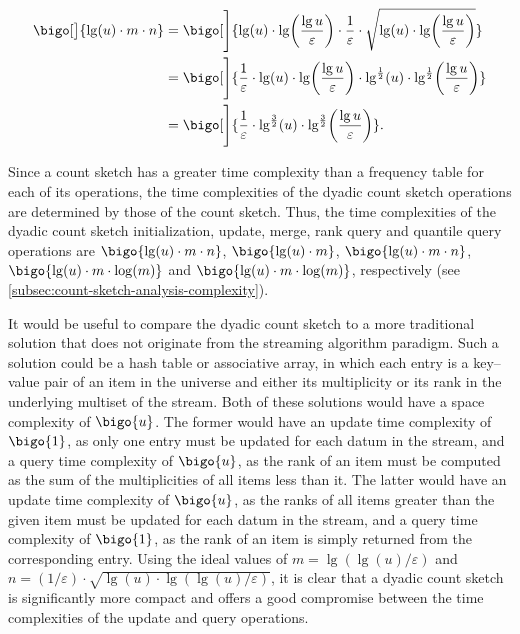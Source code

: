 \begin{equation}
  \label{eq:dyadic-count-sketch-analysis-complexity-space}
  \begin{split}
    \bigo[\big]{\lg (u) \cdot m \cdot n} &= \bigo[\Bigg]{\lg (u) \cdot \lg \biggl( \frac{\lg u}{\varepsilon} \biggr) \cdot \frac{1}{\varepsilon} \cdot \sqrt{\lg (u) \cdot \lg \biggl( \frac{\lg u}{\varepsilon} \biggr)}} \\
    &= \bigo[\Bigg]{\frac{1}{\varepsilon} \cdot \lg (u) \cdot \lg \biggl( \frac{\lg u}{\varepsilon} \biggr) \cdot \lg^{\frac{1}{2}} (u) \cdot \lg^{\frac{1}{2}} \biggl( \frac{\lg u}{\varepsilon} \biggr)} \\
    &= \bigo[\Bigg]{\frac{1}{\varepsilon} \cdot \lg^{\frac{3}{2}} (u) \cdot \lg^{\frac{3}{2}} \biggl( \frac{\lg u}{\varepsilon} \biggr)}.
  \end{split}
\end{equation}

Since a count sketch has a greater time complexity than a frequency table for each of its operations, the time complexities of the dyadic count sketch operations are determined by those of the count sketch.
Thus, the time complexities of the dyadic count sketch initialization, update, merge, rank query and quantile query operations are \( \bigo{\lg (u) \cdot m \cdot n} \), \( \bigo{\lg (u) \cdot m} \), \( \bigo{\lg (u) \cdot m \cdot n} \), \( \bigo{\lg (u) \cdot m \cdot \log (m)} \) and \( \bigo{\lg (u) \cdot m \cdot \log (m)} \), respectively (see \cref{subsec:count-sketch-analysis-complexity}).

It would be useful to compare the dyadic count sketch to a more traditional solution that does not originate from the streaming algorithm paradigm.
Such a solution could be a hash table or associative array, in which each entry is a key--value pair of an item in the universe and either its multiplicity or its rank in the underlying multiset of the stream.
Both of these solutions would have a space complexity of \( \bigo{u} \).
The former would have an update time complexity of \( \bigo{1} \), as only one entry must be updated for each datum in the stream, and a query time complexity of \( \bigo{u} \), as the rank of an item must be computed as the sum of the multiplicities of all items less than it.
The latter would have an update time complexity of \( \bigo{u} \), as the ranks of all items greater than the given item must be updated for each datum in the stream, and a query time complexity of \( \bigo{1} \), as the rank of an item is simply returned from the corresponding entry.
Using the ideal values of \( m = \lg (\lg (u) / \varepsilon) \) and \( n = (1 / \varepsilon) \cdot \sqrt{\lg (u) \cdot \lg (\lg (u) / \varepsilon)} \), it is clear that a dyadic count sketch is significantly more compact and offers a good compromise between the time complexities of the update and query operations.

